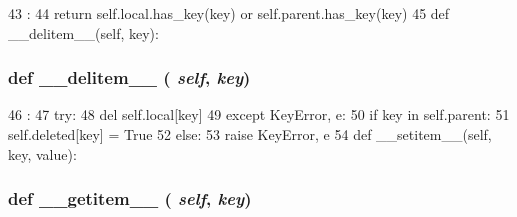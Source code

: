 \begin{DoxyCode}
43                                :
44         return self.local.has_key(key) or self.parent.has_key(key)
45 
    def __delitem__(self, key):
\end{DoxyCode}
\hypertarget{classm5_1_1util_1_1multidict_1_1multidict_a5fa6cfe34d7e2fe5b9c38e1d74fffac8}{
\subsubsection[{\_\-\_\-delitem\_\-\_\-}]{\setlength{\rightskip}{0pt plus 5cm}def \_\-\_\-delitem\_\-\_\- ( {\em self}, \/   {\em key})}}
\label{classm5_1_1util_1_1multidict_1_1multidict_a5fa6cfe34d7e2fe5b9c38e1d74fffac8}



\begin{DoxyCode}
46                               :
47         try:
48             del self.local[key]
49         except KeyError, e:
50             if key in self.parent:
51                 self.deleted[key] = True
52             else:
53                 raise KeyError, e
54 
    def __setitem__(self, key, value):
\end{DoxyCode}
\hypertarget{classm5_1_1util_1_1multidict_1_1multidict_a50d766f4276c3d8fe330ac8cd344a75f}{
\subsubsection[{\_\-\_\-getitem\_\-\_\-}]{\setlength{\rightskip}{0pt plus 5cm}def \_\-\_\-getitem\_\-\_\- ( {\em self}, \/   {\em key})}}
\label{classm5_1_1util_1_1multidict_1_1multidict_a50d766f4276c3d8fe330ac8cd344a75f}



